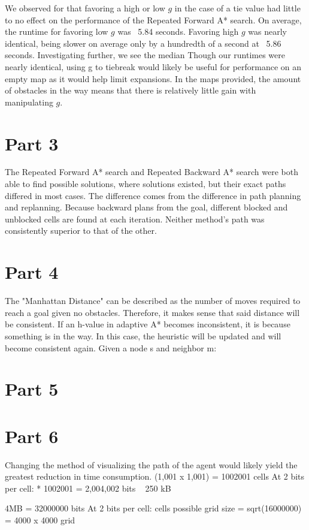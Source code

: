 \documentclass[a4paper,12pt]{article}
\begin{document}

We observed for that favoring a high or low $g$ in the case of a tie value had little to no effect on the performance of the Repeated Forward A* search. On average, the runtime for favoring low $g$ was ~5.84 seconds. Favoring high $g$ was nearly identical, being slower on average only by a hundredth of a second at ~5.86 seconds. Investigating further, we see the median Though our runtimes were nearly identical, using g to tiebreak would likely be useful for performance on an empty map as it would help limit expansions. In the maps provided, the amount of obstacles in the way means that there is relatively little gain with manipulating $g$.
 	
\section{Part 3}
The Repeated Forward A* search and Repeated Backward A* search were both able to find possible solutions, where solutions existed, but their exact paths differed in most cases. The difference comes from the difference in path planning and replanning. Because backward plans from the goal, different blocked and unblocked cells are found at each iteration. Neither method’s path was consistently superior to that of the other. 

\section{Part 4}
The "Manhattan Distance" can be described as the number of moves required to reach a goal given no obstacles. Therefore, it makes sense that said distance will be consistent. If an h-value in adaptive A* becomes inconsistent, it is because something is in the way. In this case, the heuristic will be updated and will become consistent again. \newline
Given a node s and neighbor m: \newline

\section{Part 5}

\section{Part 6}
Changing the method of visualizing the path of the agent would likely yield the greatest reduction in time consumption. 
\newline
(1,001 x 1,001) = 1002001 cells \newline
At 2 bits per cell:  * 1002001  = 2,004,002 bits ~ 250 kB \newline \newline

4MB = 32000000 bits \newline
At 2 bits per cell:  cells possible \newline 
	grid size = sqrt(16000000) = 4000 x 4000 grid
\end{document}
